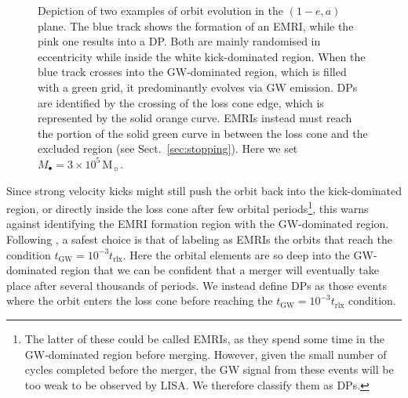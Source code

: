\documentclass[desactivate]{aa}
\begin{document}
        \begin{figure}
            \centering
            \caption{Depiction of two examples of orbit evolution in the $(1-e,a)$ plane. The blue track shows the formation of an EMRI, while the pink one results into a DP. Both are mainly randomised in eccentricity while inside the white kick-dominated region. When the blue track crosses into the GW-dominated region, which is filled with a green grid, it predominantly evolves via GW emission. DPs are identified by the crossing of the loss cone edge, which is represented by the solid orange curve. EMRIs instead must reach the portion of the solid green curve in between the loss cone and the excluded region (see Sect.\ \ref{sec:stopping}). Here we set $M_\bullet = 3 \times 10^5 \, \mathrm{M}_\sun$.}
            \label{fig:plane}
        \end{figure} 
        
        Since strong velocity kicks might still push the orbit back into the kick-dominated region, or directly inside the loss cone after few orbital periods\footnote{The latter of these could be called EMRIs, as they spend some time in the GW-dominated region before merging. However, given the small number of cycles completed before the merger, the GW signal from these events will be too weak to be observed by LISA. We therefore classify them as DPs.}, this warns against identifying the EMRI formation region with the GW-dominated region. Following \cite{2005ApJ...629..362H}, a safest choice is that of labeling as EMRIs the orbits that reach the condition $t_\mathrm{GW} = 10^{-3} t_\mathrm{rlx}$. Here the orbital elements are so deep into the GW-dominated region that we can be confident that a merger will eventually take place after several thousands of periods. We instead define DPs as those events where the orbit enters the loss cone before reaching the $t_\mathrm{GW} = 10^{-3} t_\mathrm{rlx}$ condition.
\end{document}
